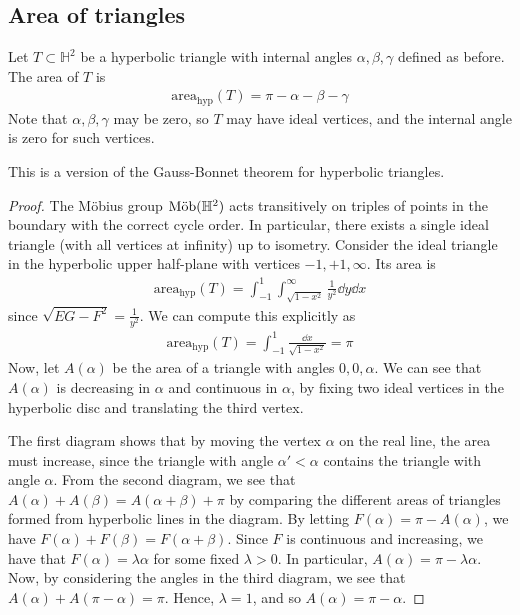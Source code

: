 \subsection{Area of triangles}
\begin{theorem}
	Let $T \subset \mathbb H^2$ be a hyperbolic triangle with internal angles $\alpha, \beta, \gamma$ defined as before.
	The area of $T$ is
	\begin{align*}
		\mathrm{area}_{\text{hyp}}(T) = \pi - \alpha - \beta - \gamma
	\end{align*}
	Note that $\alpha, \beta, \gamma$ may be zero, so $T$ may have ideal vertices, and the internal angle is zero for such vertices.
\end{theorem}
This is a version of the Gauss-Bonnet theorem for hyperbolic triangles.
\begin{proof}
	The M\"obius group $\text{M\"ob}(\mathbb H^2)$ acts transitively on triples of points in the boundary with the correct cycle order.
	In particular, there exists a single ideal triangle (with all vertices at infinity) up to isometry.
	Consider the ideal triangle in the hyperbolic upper half-plane with vertices $-1, +1, \infty$.
	Its area is
	\begin{align*}
		\mathrm{area}_{\text{hyp}}(T) = \int_{-1}^1 \int_{\sqrt{1-x^2}}^\infty \frac{1}{y^2} \dd{y} \dd{x}
	\end{align*}
	since $\sqrt{EG - F^2} = \frac{1}{y^2}$.
	We can compute this explicitly as
	\begin{align*}
		\mathrm{area}_{\text{hyp}}(T) = \int_{-1}^1 \frac{\dd{x}}{\sqrt{1-x^2}} = \pi
	\end{align*}
	Now, let $A(\alpha)$ be the area of a triangle with angles $0, 0, \alpha$.
	We can see that $A(\alpha)$ is decreasing in $\alpha$ and continuous in $\alpha$, by fixing two ideal vertices in the hyperbolic disc and translating the third vertex.
	\begin{center}
		\quad
		\quad
	\end{center}
	The first diagram shows that by moving the vertex $\alpha$ on the real line, the area must increase, since the triangle with angle $\alpha' < \alpha$ contains the triangle with angle $\alpha$.
	From the second diagram, we see that $A(\alpha) + A(\beta) = A(\alpha + \beta) + \pi$ by comparing the different areas of triangles formed from hyperbolic lines in the diagram.
	By letting $F(\alpha) = \pi - A(\alpha)$, we have $F(\alpha) + F(\beta) = F(\alpha + \beta)$.
	Since $F$ is continuous and increasing, we have that $F(\alpha) = \lambda \alpha$ for some fixed $\lambda > 0$.
	In particular, $A(\alpha) = \pi - \lambda \alpha$.
	Now, by considering the angles in the third diagram, we see that $A(\alpha) + A(\pi - \alpha) = \pi$.
	Hence, $\lambda = 1$, and so $A(\alpha) = \pi - \alpha$.


\end{proof}
